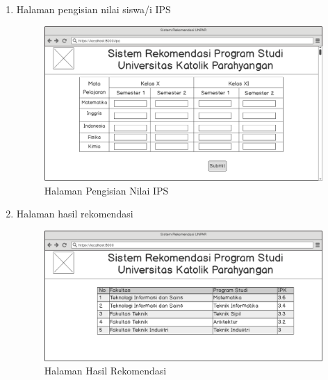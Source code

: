\begin{enumerate}
    \item Halaman pengisian nilai siswa/i IPS
    
    \begin{figure}[H]
        \centering
        \includegraphics[width = 12cm, height =8 cm]{doc/DokumenSkripsi/Gambar/gambar43.png}
        \caption{Halaman Pengisian Nilai IPS}
        \label{fig:gambar43}
    \end{figure}
    
    \item Halaman hasil rekomendasi
    
    \begin{figure}[H]
        \centering
        \includegraphics[width = 12cm, height =8 cm]{doc/DokumenSkripsi/Gambar/gambar44.png}
        \caption{Halaman Hasil Rekomendasi}
        \label{fig:gambar44}
    \end{figure}
\end{enumerate}